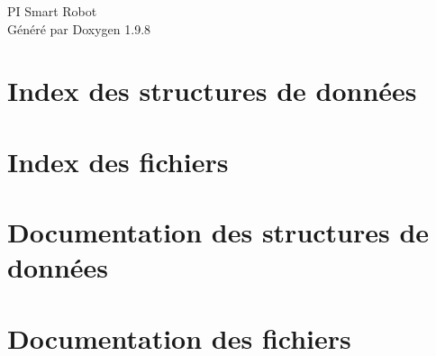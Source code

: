 \documentclass[twoside]{book}
\newcommand{\+}{\discretionary{\mbox{\scriptsize$\hookleftarrow$}}{}{}}
\newcommand{\clearemptydoublepage}{%
    \newpage{\pagestyle{empty}\cleardoublepage}%
  }
\begin{document}
  \raggedbottom
    \hypersetup{pageanchor=false,
                bookmarksnumbered=true,
                pdfencoding=unicode
               }
  \begin{titlepage}
  \vspace*{7cm}
  \begin{center}%
  {\Large PI Smart Robot}\\
  \vspace*{1cm}
  {\large Généré par Doxygen 1.9.8}\\
  \end{center}
  \end{titlepage}
  \clearemptydoublepage
  \tableofcontents
  \clearemptydoublepage
  \hypersetup{pageanchor=true}

\chapter{Index des structures de données}

\chapter{Index des fichiers}

\chapter{Documentation des structures de données}




\chapter{Documentation des fichiers}
























  \backmatter
  \newpage
  \clearemptydoublepage
  \printindex
\end{document}
